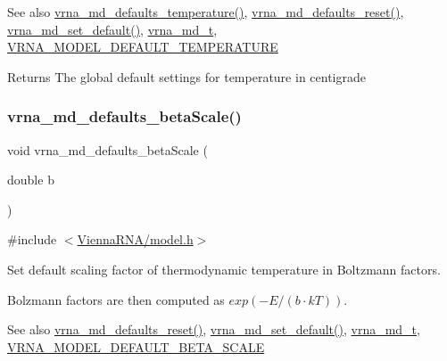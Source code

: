 \begin{DoxySeeAlso}{See also}
\mbox{\hyperlink{group__model__details_gaf9e527e9a2f7e6fd6e42bc6e602f5445}{vrna\+\_\+md\+\_\+defaults\+\_\+temperature()}}, \mbox{\hyperlink{group__model__details_ga70834424cf804d149937de89f80ceb45}{vrna\+\_\+md\+\_\+defaults\+\_\+reset()}}, \mbox{\hyperlink{group__model__details_ga8ac6ff84936282436f822644bf841f66}{vrna\+\_\+md\+\_\+set\+\_\+default()}}, \mbox{\hyperlink{group__model__details_ga1f8a10e12a0a1915f2a4eff0b28ea17c}{vrna\+\_\+md\+\_\+t}}, \mbox{\hyperlink{group__model__details_gaf47f9850b3b4763479f7a7e7a15648a2}{V\+R\+N\+A\+\_\+\+M\+O\+D\+E\+L\+\_\+\+D\+E\+F\+A\+U\+L\+T\+\_\+\+T\+E\+M\+P\+E\+R\+A\+T\+U\+RE}} 
\end{DoxySeeAlso}
\begin{DoxyReturn}{Returns}
The global default settings for temperature in centigrade 
\end{DoxyReturn}
\mbox{\label{group__model__details_gae984567db36c3f9b8731ecc917abf3a2}} 
\subsubsection{\texorpdfstring{vrna\+\_\+md\+\_\+defaults\+\_\+beta\+Scale()}{vrna\_md\_defaults\_betaScale()}}
{\footnotesize\ttfamily void vrna\+\_\+md\+\_\+defaults\+\_\+beta\+Scale (\begin{DoxyParamCaption}\item[{double}]{b }\end{DoxyParamCaption})}



{\ttfamily \#include $<$\mbox{\hyperlink{model_8h}{Vienna\+R\+N\+A/model.\+h}}$>$}



Set default scaling factor of thermodynamic temperature in Boltzmann factors. 

Bolzmann factors are then computed as $ exp(-E / (b \cdot kT))$. \begin{DoxySeeAlso}{See also}
\mbox{\hyperlink{group__model__details_ga70834424cf804d149937de89f80ceb45}{vrna\+\_\+md\+\_\+defaults\+\_\+reset()}}, \mbox{\hyperlink{group__model__details_ga8ac6ff84936282436f822644bf841f66}{vrna\+\_\+md\+\_\+set\+\_\+default()}}, \mbox{\hyperlink{group__model__details_ga1f8a10e12a0a1915f2a4eff0b28ea17c}{vrna\+\_\+md\+\_\+t}}, \mbox{\hyperlink{group__model__details_ga383d3ac8d08c3b6221754b50871c1200}{V\+R\+N\+A\+\_\+\+M\+O\+D\+E\+L\+\_\+\+D\+E\+F\+A\+U\+L\+T\+\_\+\+B\+E\+T\+A\+\_\+\+S\+C\+A\+LE}} 
\end{DoxySeeAlso}

